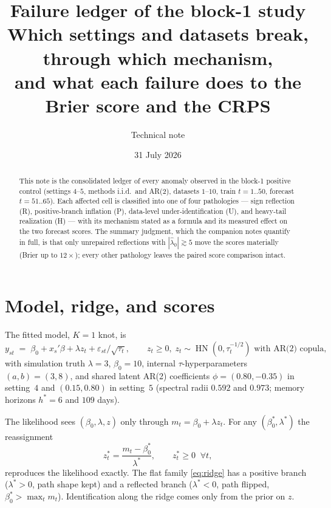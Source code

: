 \documentclass[11pt]{article}
\title{\textbf{Failure ledger of the block-1 study}\\[2pt]
\large Which settings and datasets break, through which mechanism,\\
and what each failure does to the Brier score and the CRPS}
\author{Technical note}
\date{31 July 2026}
\DeclareMathOperator{\hn}{HN}
\begin{document}
\maketitle

\begin{abstract}
This note is the consolidated ledger of every anomaly observed in the
block-1 positive control (settings $4$--$5$, methods i.i.d.\ and AR(2),
datasets $1$--$10$, train $t=1..50$, forecast $t=51..65$). Each affected
cell is classified into one of four pathologies --- sign reflection (R),
positive-branch inflation (P), data-level under-identification (U), and
heavy-tail realization (H) --- with its mechanism stated as a formula and
its measured effect on the two forecast scores. The summary judgment,
which the companion notes quantify in full, is that only unrepaired
reflections with $|\hat\lambda_0|\gtrsim 5$ move the scores materially
(Brier up to $12\times$); every other pathology leaves the paired
score comparison intact.
\end{abstract}

\section{Model, ridge, and scores}

The fitted model, $K=1$ knot, is
\begin{equation}
  y_{st} \;=\; \beta_0 + x_s'\beta + \lambda z_t + \varepsilon_{st}/\sqrt{\tau_t},
  \qquad z_t \ge 0,\; z_t \sim \hn(0, \tau_t^{-1/2}) \text{ with AR(2) copula},
  \label{eq:model}
\end{equation}
with simulation truth $\lambda = 3$, $\beta_0 = 10$, internal
$\tau$-hyperparameters $(a, b) = (3, 8)$, and shared latent AR(2)
coefficients $\phi = (0.80, -0.35)$ in setting~$4$ and $(0.15, 0.80)$ in
setting~$5$ (spectral radii $0.592$ and $0.973$; memory horizons
$h^\ast = 6$ and $109$ days).

The likelihood sees $(\beta_0, \lambda, z)$ only through
$m_t = \beta_0 + \lambda z_t$. For any $(\beta_0^\ast, \lambda^\ast)$ the
reassignment
\begin{equation}
  z_t^\ast = \frac{m_t - \beta_0^\ast}{\lambda^\ast}, \qquad
  z_t^\ast \ge 0 \;\;\forall t,
  \label{eq:ridge}
\end{equation}
reproduces the likelihood exactly. The flat family
\eqref{eq:ridge} has a positive branch ($\lambda^\ast>0$, path shape
kept) and a reflected branch ($\lambda^\ast<0$, path flipped,
$\beta_0^\ast > \max_t m_t$). Identification along the ridge comes only
from the prior on $z$.
\end{document}
